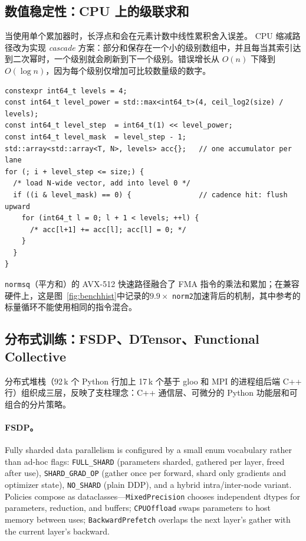\subsection{数值稳定性：CPU 上的级联求和}
\label{subsec:eval-cascadesum}

当使用单个累加器时，长浮点和会在元素计数中线性累积舍入误差。 CPU 缩减路径改为实现 \emph{cascade} 方案：部分和保存在一个小的级别数组中，并且每当其索引达到二次幂时，一个级别就会刷新到下一个级别。错误增长从 $O(n)$ 下降到 $O(\log n)$，因为每个级别仅增加可比较数量级的数字。

\begin{lstlisting}[caption={The cascade accumulator: four levels, flushed on a power-of-two cadence; vector loads feed every lane in parallel.}, label=lst:cascadesum]
constexpr int64_t levels = 4;
const int64_t level_power = std::max<int64_t>(4, ceil_log2(size) / levels);
const int64_t level_step  = int64_t(1) << level_power;
const int64_t level_mask  = level_step - 1;
std::array<std::array<T, N>, levels> acc{};   // one accumulator per lane
for (; i + level_step <= size;) {
  /* load N-wide vector, add into level 0 */
  if ((i & level_mask) == 0) {                // cadence hit: flush upward
    for (int64_t l = 0; l + 1 < levels; ++l) {
      /* acc[l+1] += acc[l]; acc[l] = 0; */
    }
  }
}
\end{lstlisting}

\texttt{normsq}（平方和）的 AVX-512 快速路径融合了 FMA 指令的乘法和累加；在兼容硬件上，这是图~\ref{fig:benchhist}中记录的$9.9\times$ \texttt{norm2}加速背后的机制，其中参考的标量循环不能使用相同的指令混合。

\subsection{分布式训练：FSDP、DTensor、Functional Collective}
\label{subsec:eval-distributed}

分布式堆栈（92\,k 个 Python 行加上 17\,k 个基于 gloo 和 MPI 的进程组后端 C++ 行）组织成三层，反映了支柱理念：C++ 通信层、可微分的 Python 功能层和可组合的分片策略。

\paragraph{FSDP。} Fully sharded data parallelism is configured by a small enum vocabulary rather than ad-hoc flags: \texttt{FULL\_SHARD} (parameters sharded, gathered per layer, freed after use), \texttt{SHARD\_GRAD\_OP} (gather once per forward, shard only gradients and optimizer state), \texttt{NO\_SHARD} (plain DDP), and a hybrid intra/inter-node variant. Policies compose as dataclasses---\texttt{MixedPrecision} chooses independent dtypes for parameters, reduction, and buffers; \texttt{CPUOffload} swaps parameters to host memory between uses; \texttt{BackwardPrefetch} overlaps the next layer's gather with the current layer's backward.

